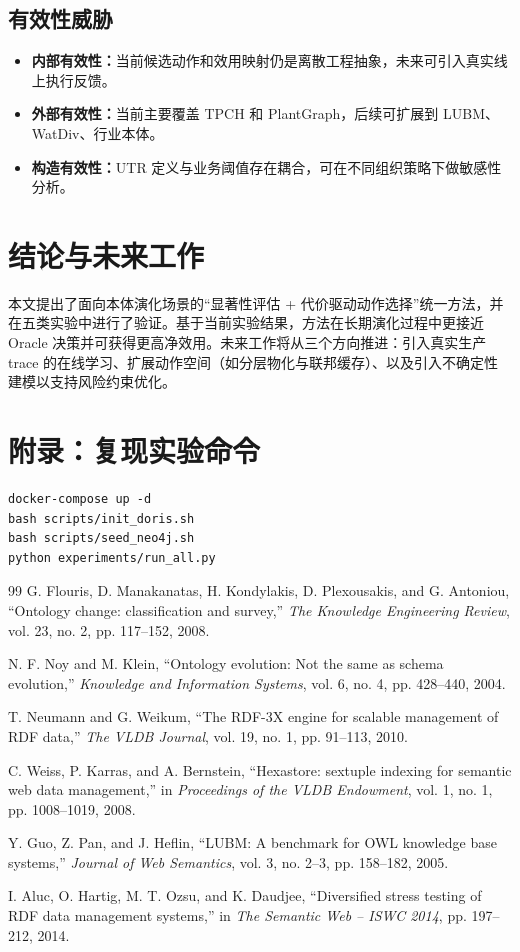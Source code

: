 \documentclass[12pt,a4paper]{ctexart}
\begin{document}
\subsection{有效性威胁}
\begin{itemize}
  \item \textbf{内部有效性：}当前候选动作和效用映射仍是离散工程抽象，未来可引入真实线上执行反馈。
  \item \textbf{外部有效性：}当前主要覆盖 TPCH 和 PlantGraph，后续可扩展到 LUBM、WatDiv、行业本体。
  \item \textbf{构造有效性：}UTR 定义与业务阈值存在耦合，可在不同组织策略下做敏感性分析。
\end{itemize}

\section{结论与未来工作}
本文提出了面向本体演化场景的“显著性评估 + 代价驱动动作选择”统一方法，并在五类实验中进行了验证。基于当前实验结果，方法在长期演化过程中更接近 Oracle 决策并可获得更高净效用。未来工作将从三个方向推进：引入真实生产 trace 的在线学习、扩展动作空间（如分层物化与联邦缓存）、以及引入不确定性建模以支持风险约束优化。

\section*{附录：复现实验命令}
\begin{verbatim}
docker-compose up -d
bash scripts/init_doris.sh
bash scripts/seed_neo4j.sh
python experiments/run_all.py
\end{verbatim}

\begin{thebibliography}{99}
G. Flouris, D. Manakanatas, H. Kondylakis, D. Plexousakis, and G. Antoniou,
``Ontology change: classification and survey,''
\textit{The Knowledge Engineering Review}, vol. 23, no. 2, pp. 117--152, 2008.

N. F. Noy and M. Klein,
``Ontology evolution: Not the same as schema evolution,''
\textit{Knowledge and Information Systems}, vol. 6, no. 4, pp. 428--440, 2004.

T. Neumann and G. Weikum,
``The RDF-3X engine for scalable management of RDF data,''
\textit{The VLDB Journal}, vol. 19, no. 1, pp. 91--113, 2010.

C. Weiss, P. Karras, and A. Bernstein,
``Hexastore: sextuple indexing for semantic web data management,''
in \textit{Proceedings of the VLDB Endowment}, vol. 1, no. 1, pp. 1008--1019, 2008.

Y. Guo, Z. Pan, and J. Heflin,
``LUBM: A benchmark for OWL knowledge base systems,''
\textit{Journal of Web Semantics}, vol. 3, no. 2--3, pp. 158--182, 2005.

I. Aluc, O. Hartig, M. T. Ozsu, and K. Daudjee,
``Diversified stress testing of RDF data management systems,''
in \textit{The Semantic Web -- ISWC 2014}, pp. 197--212, 2014.
\end{thebibliography}
\end{document}
